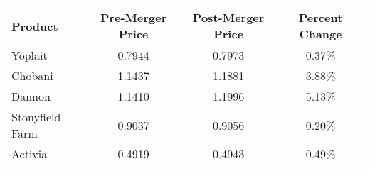 \begin{tabular}{lccc}
\hline
Product & Pre-Merger Price & Post-Merger Price & Percent Change \\
\hline
Yoplait & 0.7944 & 0.7973 & 0.37\% \\
Chobani & 1.1437 & 1.1881 & 3.88\% \\
Dannon & 1.1410 & 1.1996 & 5.13\% \\
Stonyfield Farm & 0.9037 & 0.9056 & 0.20\% \\
Activia & 0.4919 & 0.4943 & 0.49\% \\
\hline
\end{tabular}